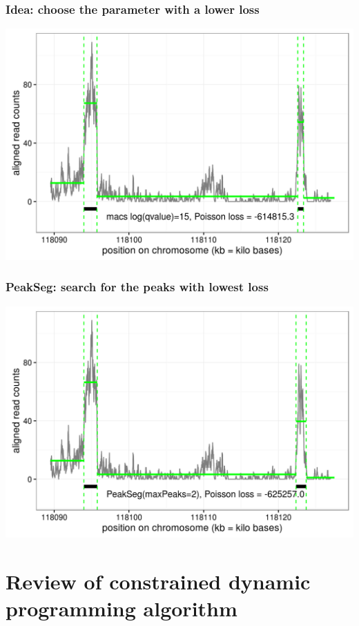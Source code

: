 \documentclass{beamer}
\begin{document}
\begin{frame}
  \frametitle{Idea: choose the parameter with a lower loss}
  \includegraphics[width=1\textwidth]{figure-macs-problem-15.png}
\end{frame}

\begin{frame}
  \frametitle{PeakSeg: search for the peaks with lowest loss}
  \includegraphics[width=1\textwidth]{figure-macs-problem-PeakSeg.png}
\end{frame}

\section{Review of constrained dynamic programming algorithm}
\end{document}
